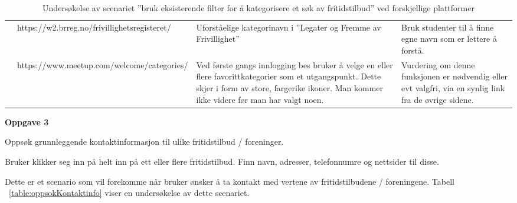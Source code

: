 \begin{center}
\begin{table}[H]
\begin{tabular}{ | m{0.7cm} | m{4cm}| m{4cm} | m{4cm} | }
 \centering 3 & \tiny https://w2.brreg.no/frivillighetsregisteret/ & \tiny Uforståelige kategorinavn i ''Legater og Fremme av Frivillighet'' & \tiny Bruk studenter til å finne egne navn som er lettere å forstå. \\
 
  \centering 2 & \tiny https://www.meetup.com/welcome/categories/ & \tiny Ved første gangs innlogging bes bruker å velge en eller flere favorittkategorier som et utgangspunkt. Dette skjer i form av store, fargerike ikoner. Man kommer ikke videre før man har valgt noen. & \tiny Vurdering om denne funksjonen er nødvendig eller evt valgfri, via en synlig link fra de øvrige sidene. \\
 \hline
\end{tabular}
\caption{Undersøkelse av scenariet ''bruk eksisterende filter for å kategorisere et søk av fritidstilbud'' ved forskjellige plattformer}
\label{table:brukFilter}
\end{table}
\end{center}
\newpage 
\textbf{Oppgave 3} \par
Oppsøk grunnleggende kontaktinformasjon til ulike fritidstilbud / foreninger.


Bruker klikker seg inn på helt inn på ett eller flere fritidstilbud. Finn navn, adresser, telefonnumre og nettsider til disse.

Dette er et scenario som vil forekomme når bruker ønsker å ta kontakt med vertene av fritidstilbudene / foreningene.
Tabell ~\ref{table:oppsokKontaktinfo} viser en undersøkelse av dette scenariet.

